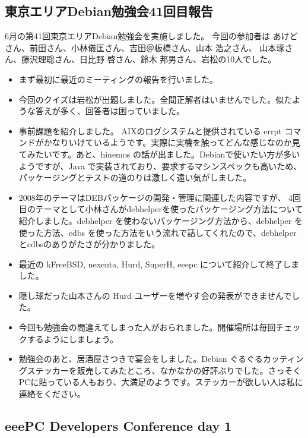 \documentclass[mingoth,a4paper]{jsarticle}
\begin{document}
\subsection{東京エリアDebian勉強会41回目報告}
6月の第41回東京エリアDebian勉強会を実施しました。 今回の参加者は あけどさん、前田さん、小林儀匡さん、吉田＠板橋さん、山本 浩之さん、 山本琢さん、藤沢理聡さん、日比野 啓さん、鈴木 邦男さん、岩松の10人でした。

\begin{itemize}
    \item まず最初に最近のミーティングの報告を行いました。
    \item 今回のクイズは岩松が出題しました。全問正解者はいませんでした。似たような答えが多く、回答者は困っていました。
    \item 事前課題を紹介しました。 AIXのログシステムと提供されている errpt コマンドがかなりいけているようです。実際に実機を触ってどんな感じなのか見てみたいです。あと、hinemos の話が出ました。Debianで使いたい方が多いようですが、Java で実装されており、要求するマシンスペックも高いため、パッケージングとテストの道のりは激しく遠い気がしました。
    \item 2008年のテーマはDEBパッケージの開発・管理に関連した内容ですが、 4回目のテーマとして小林さんがdebhelperを使ったパッケージング方法について紹介しました。debhelper を使わないパッケージング方法から、debhelper を使った方法、cdbs を使った方法をいう流れで話してくれたので、debhelperとcdbsのありがたさが分かりました。
    \item 最近の kFreeBSD, nexenta, Hurd, SuperH, eeepc について紹介して終了しました。
    \item 隠し球だった山本さんの Hurd ユーザーを増やす会の発表ができませんでした。
    \item 今回も勉強会の間違えてしまった人がおられました。開催場所は毎回チェックするようにしましょう。
    \item 勉強会のあと、居酒屋さつきで宴会をしました。Debian ぐるぐるカッティングステッカーを販売してみたところ、なかなかの好評ぶりでした。さっそくPCに貼っている人もおり、大満足のようです。ステッカーが欲しい人は私に連絡をください。 
\end{itemize}



\subsection{eeePC Developers Conference day 1}
\end{document}
